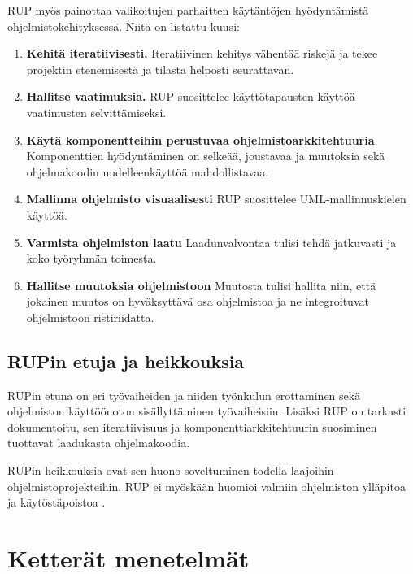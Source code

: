\documentclass[finnish,12pt]{tktltiki2}
\theoremstyle{definition}
\theoremstyle{remark}
\begin{document}
RUP myös painottaa valikoitujen parhaitten käytäntöjen hyödyntämistä ohjelmistokehityksessä. Niitä on listattu kuusi\cite{rational01}: 

\begin{enumerate}
\item \textbf{Kehitä iteratiivisesti.} Iteratiivinen kehitys vähentää riskejä ja tekee projektin etenemisestä ja tilasta helposti seurattavan.
\item \textbf{Hallitse vaatimuksia.} RUP suosittelee käyttötapausten käyttöä vaatimusten selvittämiseksi.
\item \textbf{Käytä komponentteihin perustuvaa ohjelmistoarkkitehtuuria} Komponenttien hyödyntäminen on selkeää, joustavaa ja muutoksia sekä ohjelmakoodin uudelleenkäyttöä mahdollistavaa.
\item \textbf{Mallinna ohjelmisto visuaalisesti} RUP suosittelee UML-mallinnuskielen käyttöä.
\item \textbf{Varmista ohjelmiston laatu} Laadunvalvontaa tulisi tehdä jatkuvasti ja koko työryhmän toimesta.
\item \textbf{Hallitse muutoksia ohjelmistoon} Muutosta tulisi hallita niin, että jokainen muutos on hyväksyttävä osa ohjelmistoa ja ne integroituvat ohjelmistoon ristiriidatta.
\end{enumerate}



\subsection{RUPin etuja ja heikkouksia}

RUPin etuna on eri työvaiheiden ja niiden työnkulun erottaminen sekä ohjelmiston käyttöönoton sisällyttäminen työvaiheisiin\cite{Sommerville10}. Lisäksi RUP on tarkasti dokumentoitu, sen iteratiivisuus ja komponenttiarkkitehtuurin suosiminen tuottavat laadukasta ohjelmakoodia.

RUPin heikkouksia ovat sen huono soveltuminen todella laajoihin ohjelmistoprojekteihin\cite{Ramsin:2008:PRO:1322432.1322435, Ruparelia:2010:SDL:1764810.1764814}. RUP ei myöskään huomioi valmiin ohjelmiston ylläpitoa ja käytöstäpoistoa \cite{Ramsin:2008:PRO:1322432.1322435}. 


\section{Ketterät menetelmät}
\end{document}
